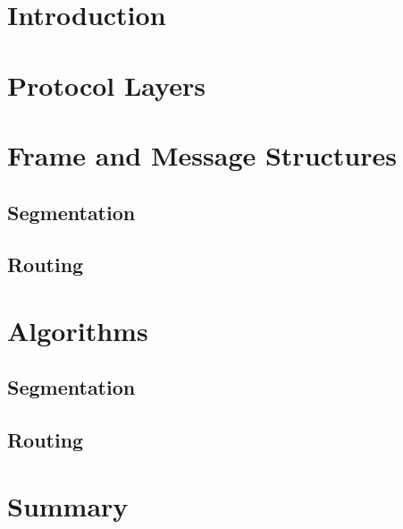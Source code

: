\documentclass{article}
\begin{document}
\title{}
\author{Group 7: \\ Sanjar Karaev, Igor Stassiy, Kirill Afanasev}
\date{\today}
\maketitle

\section{Introduction}

\section{Protocol Layers}

\section{Frame and Message Structures}

\subsection{Segmentation}

\subsection{Routing}

\section{Algorithms}

\subsection{Segmentation}

\subsection{Routing}

\section{Summary}
\end{document}
